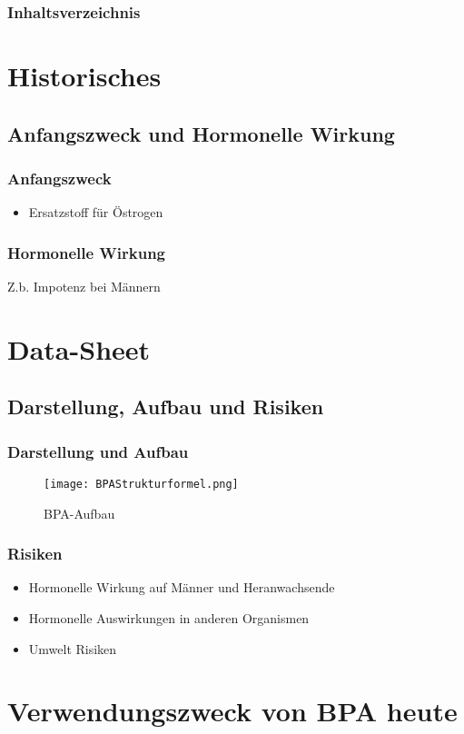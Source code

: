 \documentclass[hyperref={pdfpagelabels=false}]{beamer}
\begin{document}
\begin{frame}
\titlepage
\end{frame} 

\begin{frame}
\frametitle{Inhaltsverzeichnis}
\tableofcontents
\end{frame} 


\section{Historisches} 
\subsection{Anfangszweck und Hormonelle Wirkung}
\begin{frame}
\frametitle{Anfangszweck}
\begin{itemize}
\item Ersatzstoff für Östrogen
\end{itemize}

\end{frame}
\begin{frame}
\frametitle{Hormonelle Wirkung}
Z.b. Impotenz bei Männern
\end{frame}


\section{Data-Sheet} 
\subsection{Darstellung, Aufbau und Risiken}
\begin{frame}
\frametitle{Darstellung und Aufbau}
\begin{figure}
\texttt{[image: BPAStrukturformel.png]}
\caption{BPA-Aufbau}
\end{figure}
\end{frame}

\begin{frame}
\frametitle{Risiken}
\begin{itemize}[<+->]
\item  Hormonelle Wirkung auf Männer und Heranwachsende
\item  Hormonelle Auswirkungen in anderen Organismen
\item  Umwelt Risiken
\end{itemize} 
\end{frame}

\section{Verwendungszweck von BPA heute} 
\end{document}
